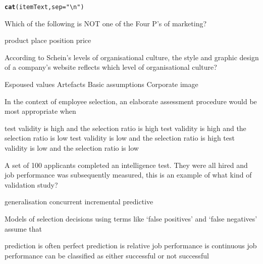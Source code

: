 \documentclass[12pt, a4paper]{exam}\usepackage[]{graphicx}\usepackage[]{color}
\makeatletter
\newcommand{\hlstr}[1]{\textcolor[rgb]{0.192,0.494,0.8}{#1}}%
\newcommand{\hlstd}[1]{\textcolor[rgb]{0.345,0.345,0.345}{#1}}%
\newcommand{\hlkwc}[1]{\textcolor[rgb]{0.333,0.667,0.333}{#1}}%
\newcommand{\hlkwd}[1]{\textcolor[rgb]{0.737,0.353,0.396}{\textbf{#1}}}%
\newenvironment{kframe}{%
 \def\at@end@of@kframe{}%
 \ifinner\ifhmode%
  \def\at@end@of@kframe{\end{minipage}}%
  \begin{minipage}{\columnwidth}%
 \fi\fi%
 \def\FrameCommand##1{\hskip\@totalleftmargin \hskip-\fboxsep
 \colorbox{shadecolor}{##1}\hskip-\fboxsep
     \hskip-\linewidth \hskip-\@totalleftmargin \hskip\columnwidth}%
 \MakeFramed {\advance\hsize-\width
   \@totalleftmargin\z@ \linewidth\hsize
   \@setminipage}}%
 {\par\unskip\endMakeFramed%
 \at@end@of@kframe}
\makeatother
\begin{document}
\begin{questions}
\begin{kframe}
\begin{alltt}
\hlkwd{cat}\hlstd{(itemText,} \hlkwc{sep} \hlstd{=} \hlstr{"\textbackslash{}n"}\hlstd{)}
\end{alltt}
\end{kframe}\filbreak
\question
 Which of the following is NOT one of the Four P's of marketing?
\begin{choices}
\choice product
\choice place
\choice position
\choice price
\vspace{10 mm}
\end{choices}


\filbreak
\question
 According to Schein's levels of organisational culture, the style and graphic design of a company's website reflects which level of organisational culture?
\begin{choices}
\choice Espoused values
\choice Artefacts
\choice Basic assumptions
\choice Corporate image
\vspace{10 mm}
\end{choices}


\filbreak
\question
 In the context of employee selection, an elaborate assessment procedure would be most appropriate when
\begin{choices}
\choice test validity is high and the selection ratio is high
\choice test validity is high and the selection ratio is low
\choice test validity is low and the selection ratio is high
\choice test validity is low and the selection ratio is low
\vspace{10 mm}
\end{choices}


\filbreak
\question
 A set of 100 applicants completed an intelligence test. They were all hired and job performance was subsequently measured, this is an example of what kind of validation study?
\begin{choices}
\choice generalisation
\choice concurrent
\choice incremental
\choice predictive
\vspace{10 mm}
\end{choices}


\filbreak
\question
 Models of selection decisions using terms like `false positives' and `false negatives' assume that
\begin{choices}
\choice prediction is often perfect
\choice prediction is relative
\choice job performance is continuous
\choice job performance can be classified as either successful or not successful
\vspace{10 mm}
\end{choices}



\end{questions}
\end{document}
